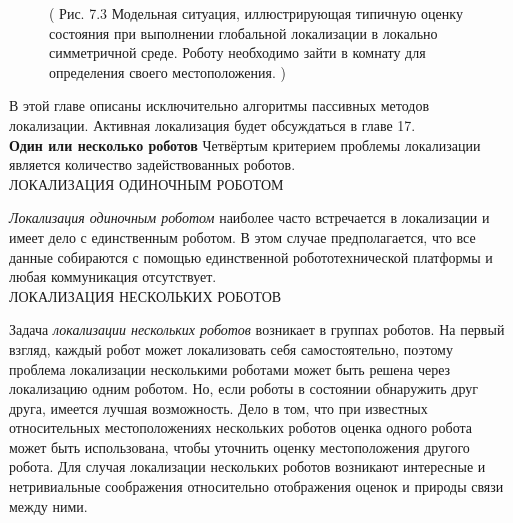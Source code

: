 \documentclass[10pt,a4paper]{article}
\begin{document}
\begin{figure}[H]
	\caption{ (  Рис. 7.3 Модельная ситуация, иллюстрирующая типичную оценку состояния при выполнении глобальной локализации в локально симметричной среде. Роботу необходимо зайти в комнату для определения своего местоположения. 	)}
	\label{fig:73orig}
\end{figure}

В этой главе описаны исключительно алгоритмы пассивных методов локализации. Активная локализация будет обсуждаться в главе 17.\\

\textbf{Один или несколько роботов} Четвёртым критерием проблемы локализации является количество задействованных роботов.\\ 
ЛОКАЛИЗАЦИЯ ОДИНОЧНЫМ РОБОТОМ

\textit{Локализация одиночным роботом} наиболее часто встречается в локализации и имеет дело с единственным роботом. В этом случае предполагается, что все данные собираются с помощью единственной робототехнической платформы и любая коммуникация отсутствует.\\ 
ЛОКАЛИЗАЦИЯ НЕСКОЛЬКИХ РОБОТОВ

Задача \textit{локализации нескольких роботов} возникает в группах роботов. На первый взгляд, каждый робот может локализовать себя самостоятельно, поэтому проблема локализации несколькими роботами может быть решена через локализацию одним роботом. Но, если роботы в состоянии обнаружить друг друга, имеется лучшая возможность. 
Дело в том, что при известных относительных местоположениях нескольких роботов оценка одного робота может быть использована, чтобы уточнить оценку местоположения другого робота. Для случая локализации нескольких роботов возникают интересные и нетривиальные соображения относительно отображения оценок и природы связи между ними. 
\end{document}
